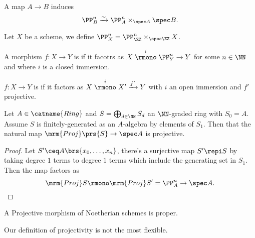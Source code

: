 \documentclass[10pt,a4paper,twoside,openany,hidelinks]{book}
\begin{document}
\begin{remark}
A map $A \to B$ induces
$$\PP_{B}^n \xrightarrow{\sim} \PP_A^n \times_{\spec A} \spec B \text{.}$$
\end{remark}

\begin{definition}
Let $X$ be a scheme, we define $\PP_{X}^{n} = \PP_{\ZZ}^n \times_{\spec \ZZ} X$.
\end{definition}

\begin{definition}
A morphism $f \colon X \to Y$ is  if it facotrs as
$X \stackrel{i}{\rmono} \PP_Y^n \to Y$ for some $n \in \NN$ and where $i$ is a closed immersion.
\end{definition}

\begin{definition}
$f \colon X \to Y$ is  if it factors as $X \stackrel{i}{\rmono} X' \xrightarrow{f'} Y$ with $i$ an open immersion and $f'$ projective.
\end{definition}

\begin{claim}
Let $A \in \catname{Ring}$ and $S = \bigoplus_{d \in \NN} S_d$ an $\NN$-graded ring with $S_0 = A$. Assume $S$ is finitely-generated as an $A$-algebra by elements of $S_1$.
Then that the natural map
$\mrm{Proj}\prs{S} \to \spec A$ is projective.
\end{claim}

\begin{proof}
Let $S' \ceq A\brs{x_0, \ldots, x_n}$, there's a surjective map $S' \repi S$ by taking degree $1$ terms to degree $1$ terms which include the generating set in $S_1$.
Then the map factors as
$$\mrm{Proj} S \rmono \mrm{Proj} S' = \PP_A^n \to \spec A \text{.}$$
\end{proof}

\begin{theorem}
A Projective morphism of Noetherian schemes is proper.
\end{theorem}

\begin{remark}
Our definition of projectivity is not the most flexible.
\end{remark}

\backmatter
\end{document}
